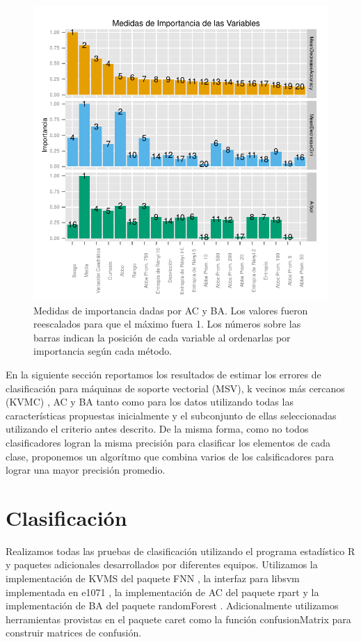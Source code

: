 \documentclass[letterpaper,12pt]{book}
\begin{document}
\begin{figure}
  \centering
  \includegraphics[width = \textwidth]{./img/CClasificacion/importancias.pdf}
  \caption{Medidas de importancia dadas por AC y BA. Los valores fueron reescalados para que el máximo fuera 1. Los números sobre las barras indican la posición de cada variable al ordenarlas por importancia según cada método.}
  \label{fig:importancias}
  \centering
\end{figure}

En la siguiente sección reportamos los resultados de estimar los errores de clasificación para máquinas de soporte vectorial (MSV), k vecinos más cercanos (KVMC) , AC y BA tanto como para los datos utilizando todas las características propuestas inicialmente y el subconjunto de ellas seleccionadas utilizando el criterio antes descrito. De la misma forma, como no todos clasificadores logran la misma precisión para clasificar los elementos de cada clase, proponemos un algorítmo que combina varios de los calsificadores para lograr una mayor precisión promedio. 


\section{Clasificación}

Realizamos todas las pruebas de clasificación utilizando el programa estadístico R\cite{rbase} y paquetes adicionales desarrollados por diferentes equipos. Utilizamos la implementación de KVMS del paquete FNN \cite{FNN}, la interfaz para libsvm \cite{chang_libsvm:_2011} implementada en e1071 \cite{e1071}, la implementación de AC del paquete rpart \cite{rpart} y la implementación de BA del paquete randomForest \cite{randomForest}. Adicionalmente utilizamos herramientas provistas en el paquete caret \cite{caret} como la función confusionMatrix para construir matrices de confusión.
\end{document}
